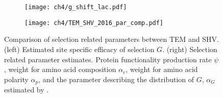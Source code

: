\begin{figure}[h]
    \centering
    \begin{subfigure}
        \centering
        \texttt{[image: ch4/g\_shift\_lac.pdf]}
    \end{subfigure}
    \begin{subfigure}
        \centering
        \texttt{[image: ch4/TEM\_SHV\_2016\_par\_comp.pdf]}
    \end{subfigure}
    \caption{Comparison of selection related parameters between TEM and SHV. 
    (left) Estimated site specific efficacy of selection $G$. 
    (right) Selection related parameter estimates. 
    Protein functionality production rate $\psi$, \PC weight for amino acid composition $\alpha_c$, \PC weight for amino acid polarity $\alpha_p$, and the parameter describing the distribution of $G$, $\alpha_G$ estimated by \selac.}
    \label{fig:tem_shv_param_comp}
\end{figure}
